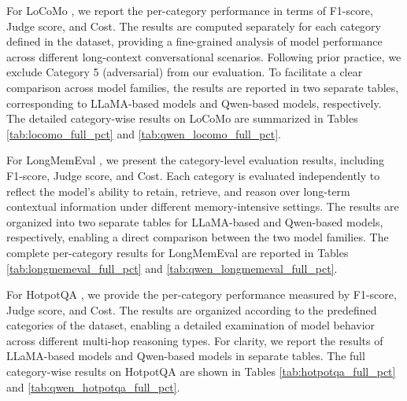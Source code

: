 For LoCoMo \citep{maharana2024evaluating-locomo}, we report the per-category performance in terms of F1-score, Judge score, and Cost. The results are computed separately for each category defined in the dataset, providing a fine-grained analysis of model performance across different long-context conversational scenarios. Following prior practice, we exclude Category 5 (adversarial) from our evaluation. To facilitate a clear comparison across model families, the results are reported in two separate tables, corresponding to LLaMA-based models and Qwen-based models, respectively. The detailed category-wise results on LoCoMo are summarized in Tables \ref{tab:locomo_full_pct} and \ref{tab:qwen_locomo_full_pct}.




For LongMemEval \citep{wu2024longmemeval}, we present the category-level evaluation results, including F1-score, Judge score, and Cost. Each category is evaluated independently to reflect the model’s ability to retain, retrieve, and reason over long-term contextual information under different memory-intensive settings. The results are organized into two separate tables for LLaMA-based and Qwen-based models, respectively, enabling a direct comparison between the two model families. The complete per-category results for LongMemEval are reported in Tables \ref{tab:longmemeval_full_pct} and \ref{tab:qwen_longmemeval_full_pct}.




For HotpotQA \cite{yang2018hotpotqa}, we provide the per-category performance measured by F1-score, Judge score, and Cost. The results are organized according to the predefined categories of the dataset, enabling a detailed examination of model behavior across different multi-hop reasoning types. For clarity, we report the results of LLaMA-based models and Qwen-based models in separate tables. The full category-wise results on HotpotQA are shown in Tables \ref{tab:hotpotqa_full_pct} and \ref{tab:qwen_hotpotqa_full_pct}.
















